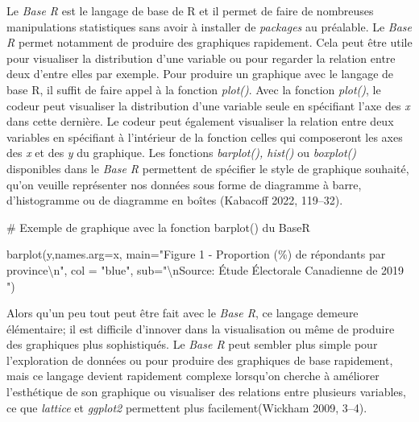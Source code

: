 \documentclass[
  letterpaper,
]{scrbook}
\newenvironment{Shaded}{\begin{snugshade}}{\end{snugshade}}
\newcommand{\AttributeTok}[1]{\textcolor[rgb]{0.40,0.45,0.13}{#1}}
\newcommand{\CommentTok}[1]{\textcolor[rgb]{0.37,0.37,0.37}{#1}}
\newcommand{\FunctionTok}[1]{\textcolor[rgb]{0.28,0.35,0.67}{#1}}
\newcommand{\NormalTok}[1]{\textcolor[rgb]{0.00,0.23,0.31}{#1}}
\newcommand{\SpecialCharTok}[1]{\textcolor[rgb]{0.37,0.37,0.37}{#1}}
\newcommand{\StringTok}[1]{\textcolor[rgb]{0.13,0.47,0.30}{#1}}
\begin{document}
Le \emph{Base R} est le langage de base de R et il permet de faire de
nombreuses manipulations statistiques sans avoir à installer de
\emph{packages} au préalable. Le \emph{Base R} permet notamment de
produire des graphiques rapidement. Cela peut être utile pour visualiser
la distribution d'une variable ou pour regarder la relation entre deux
d'entre elles par exemple. Pour produire un graphique avec le langage de
base R, il suffit de faire appel à la fonction \emph{plot()}. Avec la
fonction \emph{plot()}, le codeur peut visualiser la distribution d'une
variable seule en spécifiant l'axe des \emph{x} dans cette dernière. Le
codeur peut également visualiser la relation entre deux variables en
spécifiant à l'intérieur de la fonction celles qui composeront les axes
des \emph{x} et des \emph{y} du graphique. Les fonctions
\emph{barplot(), hist()} ou \emph{boxplot()} disponibles dans le
\emph{Base R} permettent de spécifier le style de graphique souhaité,
qu'on veuille représenter nos données sous forme de diagramme à barre,
d'histogramme ou de diagramme en boîtes (Kabacoff 2022, 119--32).

\begin{Shaded}
\begin{Highlighting}[]
\CommentTok{\# Exemple de graphique avec la fonction barplot() du BaseR}

\FunctionTok{barplot}\NormalTok{(y,}\AttributeTok{names.arg=}\NormalTok{x,}
 \AttributeTok{main=}\StringTok{"Figure 1 {-} Proportion (\%) de répondants par province}\SpecialCharTok{\textbackslash{}n}\StringTok{"}\NormalTok{,}
 \AttributeTok{col =} \StringTok{"blue"}\NormalTok{,}
 \AttributeTok{sub=}\StringTok{"}\SpecialCharTok{\textbackslash{}n}\StringTok{Source: Étude Électorale Canadienne de 2019                                                "}\NormalTok{) }
\end{Highlighting}
\end{Shaded}

Alors qu'un peu tout peut être fait avec le \emph{Base R}, ce langage
demeure élémentaire; il est difficile d'innover dans la visualisation ou
même de produire des graphiques plus sophistiqués. Le \emph{Base R} peut
sembler plus simple pour l'exploration de données ou pour produire des
graphiques de base rapidement, mais ce langage devient rapidement
complexe lorsqu'on cherche à améliorer l'esthétique de son graphique ou
visualiser des relations entre plusieurs variables, ce que
\emph{lattice} et \emph{ggplot2} permettent plus facilement(Wickham
2009, 3--4).
\end{document}
